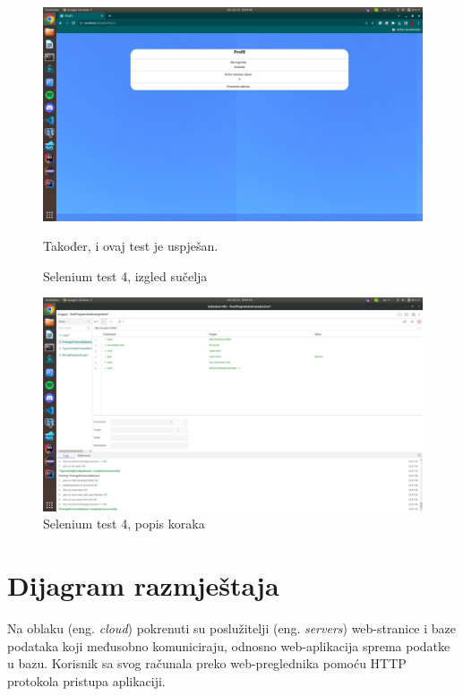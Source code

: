 			\begin{figure}[H]
			\includegraphics[width=\textwidth]{slike/sel4a.jpeg} %
			\caption{Selenium test 4, izgled sučelja}
			\label{fig:sel4a} %
			Također, i ovaj test je uspješan.
			\end{figure}
			\begin{figure}[H]
			\includegraphics[width=\textwidth]{slike/sel4b.jpeg} %
			\caption{Selenium test 4, popis koraka}
			\label{fig:sel4b} %
			\end{figure}
			
			\eject 
		
		
		\section{Dijagram razmještaja}
			
			
			 Na oblaku (eng. \textit{cloud}) pokrenuti su poslužitelji (eng. \textit{servers}) web-stranice i baze podataka koji međusobno komuniciraju, odnosno web-aplikacija sprema podatke u bazu. Korisnik sa svog računala preko web-preglednika pomoću HTTP protokola pristupa aplikaciji.
			 
